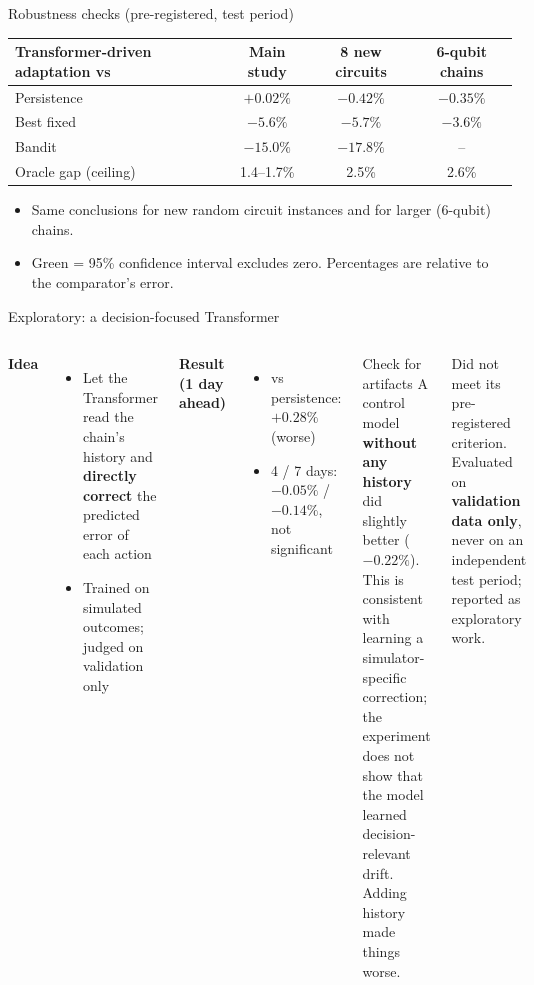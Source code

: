 \documentclass[aspectratio=169,11pt]{beamer}
\newcommand{\good}[1]{\textcolor{qgreen}{\textbf{#1}}}
\newcommand{\bad}[1]{\textcolor{qred}{\textbf{#1}}}
\begin{document}
\begin{frame}{Robustness checks (pre-registered, test period)}
\begin{table}\small
\begin{tabular}{lccc}
\toprule
\textbf{Transformer-driven adaptation vs} & \textbf{Main study} & \textbf{8 new circuits} & \textbf{6-qubit chains} \\
\midrule
Persistence & $+0.02\%$ & $-0.42\%$ & $-0.35\%$ \\
Best fixed & \good{$-5.6\%$} & \good{$-5.7\%$} & $-3.6\%$ \\
Bandit & \good{$-15.0\%$} & \good{$-17.8\%$} & -- \\
Oracle gap (ceiling) & 1.4--1.7\% & 2.5\% & 2.6\% \\
\bottomrule
\end{tabular}
\end{table}
\begin{itemize}
\item Same conclusions for new random circuit instances and for larger (6-qubit) chains.
\item Green = 95\% confidence interval excludes zero. Percentages are relative to the comparator's error.
\end{itemize}
\end{frame}

\begin{frame}{Exploratory: a decision-focused Transformer}
\begin{columns}[T]
\textbf{Idea}
\begin{itemize}
\item Let the Transformer read the chain's history and \textbf{directly correct} the predicted error of each action
\item Trained on simulated outcomes; judged on validation only
\end{itemize}
\textbf{Result (1 day ahead)}
\begin{itemize}
\item vs persistence: \bad{$+0.28\%$} (worse)
\item 4 / 7 days: $-0.05\%$ / $-0.14\%$, not significant
\end{itemize}
\begin{alertblock}{Check for artifacts}
A control model \textbf{without any history} did slightly better ($-0.22\%$). This is consistent with learning a simulator-specific correction; the experiment does not show that the model learned decision-relevant drift. Adding history made things worse.
\end{alertblock}
\vspace{0.2cm}
Did not meet its pre-registered criterion. Evaluated on \textbf{validation data only}, never on an independent test period; reported as exploratory work.
\end{columns}
\end{frame}
\end{document}
